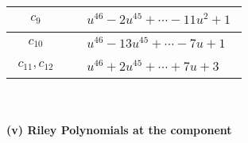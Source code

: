 \documentclass[1p]{elsarticle_modified}
\theoremstyle{definition}
\begin{document}
\begin{tabular}{m{50pt}|m{274pt}}
\hline $$\begin{aligned}c_{9}\end{aligned}$$&$\begin{aligned}
&u^{46}-2 u^{45}+\cdots-11 u^2+1
\end{aligned}$\\
\hline $$\begin{aligned}c_{10}\end{aligned}$$&$\begin{aligned}
&u^{46}-13 u^{45}+\cdots-7 u+1
\end{aligned}$\\
\hline $$\begin{aligned}c_{11},c_{12}\end{aligned}$$&$\begin{aligned}
&u^{46}+2 u^{45}+\cdots+7 u+3
\end{aligned}$\\
\hline
\end{tabular}\\~\\
\newpage\renewcommand{\arraystretch}{1}
\flushleft \textbf{(v) Riley Polynomials at the component}\newline \\
\end{document}
